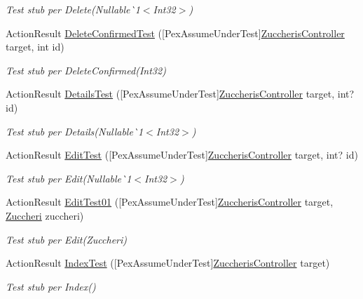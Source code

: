 \begin{DoxyCompactItemize}
\begin{DoxyCompactList}\small\item\em Test stub per Delete(Nullable\`{}1$<$Int32$>$)\end{DoxyCompactList}\item 
Action\+Result \mbox{\hyperlink{class_brew_day2_1_1_tests_1_1_zuccheris_controller_test_af829e12e0a9fc549b7457ab04fc557b7}{Delete\+Confirmed\+Test}} (\mbox{[}Pex\+Assume\+Under\+Test\mbox{]}\mbox{\hyperlink{class_brew_day2_1_1_controllers_1_1_zuccheris_controller}{Zuccheris\+Controller}} target, int id)
\begin{DoxyCompactList}\small\item\em Test stub per Delete\+Confirmed(\+Int32)\end{DoxyCompactList}\item 
Action\+Result \mbox{\hyperlink{class_brew_day2_1_1_tests_1_1_zuccheris_controller_test_a432b1204fc1d9e7875dab51f40ce4a87}{Details\+Test}} (\mbox{[}Pex\+Assume\+Under\+Test\mbox{]}\mbox{\hyperlink{class_brew_day2_1_1_controllers_1_1_zuccheris_controller}{Zuccheris\+Controller}} target, int? id)
\begin{DoxyCompactList}\small\item\em Test stub per Details(Nullable\`{}1$<$Int32$>$)\end{DoxyCompactList}\item 
Action\+Result \mbox{\hyperlink{class_brew_day2_1_1_tests_1_1_zuccheris_controller_test_afe22bd2a1befc8a0e2a0a87a647d132c}{Edit\+Test}} (\mbox{[}Pex\+Assume\+Under\+Test\mbox{]}\mbox{\hyperlink{class_brew_day2_1_1_controllers_1_1_zuccheris_controller}{Zuccheris\+Controller}} target, int? id)
\begin{DoxyCompactList}\small\item\em Test stub per Edit(Nullable\`{}1$<$Int32$>$)\end{DoxyCompactList}\item 
Action\+Result \mbox{\hyperlink{class_brew_day2_1_1_tests_1_1_zuccheris_controller_test_aa0c503908420f07be58ae9acc5e9cdcd}{Edit\+Test01}} (\mbox{[}Pex\+Assume\+Under\+Test\mbox{]}\mbox{\hyperlink{class_brew_day2_1_1_controllers_1_1_zuccheris_controller}{Zuccheris\+Controller}} target, \mbox{\hyperlink{class_brew_day2_1_1_models_1_1_zuccheri}{Zuccheri}} zuccheri)
\begin{DoxyCompactList}\small\item\em Test stub per Edit(\+Zuccheri)\end{DoxyCompactList}\item 
Action\+Result \mbox{\hyperlink{class_brew_day2_1_1_tests_1_1_zuccheris_controller_test_a883cece545ef2be30f3b7b912bb2e2cc}{Index\+Test}} (\mbox{[}Pex\+Assume\+Under\+Test\mbox{]}\mbox{\hyperlink{class_brew_day2_1_1_controllers_1_1_zuccheris_controller}{Zuccheris\+Controller}} target)
\begin{DoxyCompactList}\small\item\em Test stub per Index()\end{DoxyCompactList}\end{DoxyCompactItemize}


